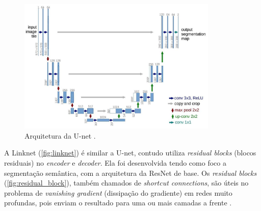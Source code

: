 \documentclass[12pt, a4paper, english, brazil]{article}
\begin{document}
\begin{figure}[htbp]
    \centering
    \includegraphics[width=0.85\textwidth]{img/unet.jpg}
    \caption{Arquitetura da U-net \cite{Ronneberge_2015}.}
    \label{fig:unet}
\end{figure}

A Linknet (\autoref{fig:linknet}) é similar a U-net, contudo utiliza  \textit{residual blocks} (blocos residuais) no \textit{encoder} e \textit{decoder}. Ela foi desenvolvida tendo como foco a segmentação semântica, com a arquitetura da ResNet de base. Os \textit{residual blocks} (\autoref{fig:residual_block}), também chamados de \textit{shortcut connections}, são úteis no problema de \textit{vanishing gradient} (dissipação do gradiente) em redes muito profundas, pois enviam o resultado para uma ou mais camadas a frente \cite{Chaurasia_2017, Ebrahimi_2021}.
\end{document}
